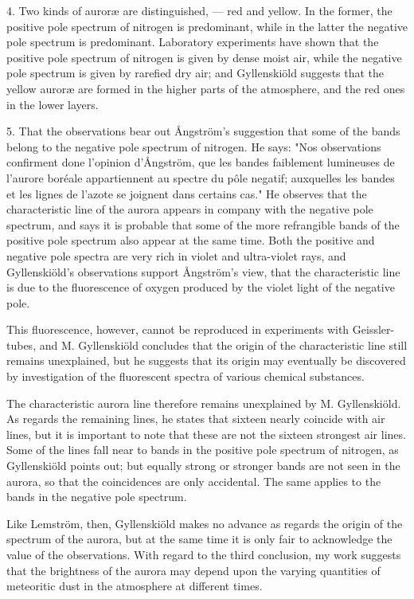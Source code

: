 \documentclass[a4paper, 12pt, oneside, polutonikogreek, english]{article}
\begin{document}
4. Two kinds of auroræ are distinguished, --- red and yellow. In the former, the positive pole spectrum of nitrogen is predominant, while in the latter the negative pole spectrum is predominant. Laboratory experiments have shown that the positive pole spectrum of nitrogen is given by dense moist air, while the negative pole spectrum is given by rarefied dry air; and Gyllenskiöld suggests that the yellow auroræ are formed in the higher parts of the atmosphere, and the red ones in the lower layers.

5. That the observations bear out Ångström's suggestion that some of the bands belong to the negative pole spectrum of nitrogen. He says: "Nos observations confirment done l'opinion d'Ångström, que les bandes faiblement lumineuses de l'aurore boréale appartiennent au spectre du pôle negatif; auxquelles les bandes et les lignes de l'azote se joignent dans certains cas." He observes that the characteristic line of the aurora appears in company with the negative pole spectrum, and says it is probable that some of the more refrangible bands of the positive pole spectrum also appear at the same time. Both the positive and negative pole spectra are very rich in violet and ultra-violet rays, and Gyllenskiöld's observations support Ångström's view, that the characteristic line is due to the fluorescence of oxygen produced by the violet light of the negative pole.

This fluorescence, however, cannot be reproduced in experiments with Geissler-tubes, and M. Gyllenskiöld concludes that the origin of the characteristic line still remains unexplained, but he suggests that its origin may eventually be discovered by investigation of the fluorescent spectra of various chemical substances.

The characteristic aurora line therefore remains unexplained by M. Gyllenskiöld. As regards the remaining lines, he states that sixteen nearly coincide with air lines, but it is important to note that these are not the sixteen strongest air lines. Some of the lines fall near to bands in the positive pole spectrum of nitrogen, as Gyllenskiöld points out; but equally strong or stronger bands are not seen in the aurora, so that the coincidences are only accidental. The same applies to the bands in the negative pole spectrum.

Like Lemström, then, Gyllenskiöld makes no advance as regards the origin of the spectrum of the aurora, but at the same time it is only fair to acknowledge the value of the observations. With regard to the third conclusion, my work suggests that the brightness of the aurora may depend upon the varying quantities of meteoritic dust in the atmosphere at different times.
\end{document}
